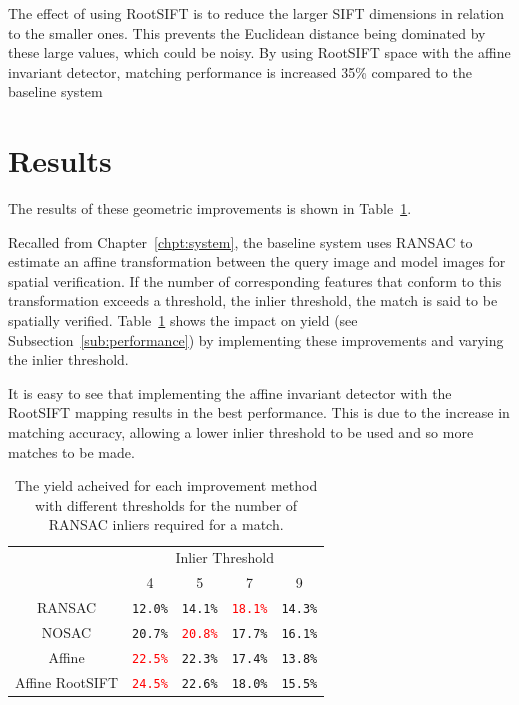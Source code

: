\documentclass[11pt, onecolumn, a4paper, final]{report} %
\begin{document}
The effect of using RootSIFT is to reduce the larger SIFT dimensions in relation to the smaller ones. This prevents the Euclidean distance being dominated by these large values, which could be noisy. By using RootSIFT space with the affine invariant detector, matching performance is increased 35\% compared to the baseline system



\section{Results}
The results of these geometric improvements is shown in Table~\ref{tbl:improvements}. 

Recalled from Chapter~\ref{chpt:system}, the baseline system uses RANSAC to estimate an affine transformation between the query image and model images for spatial verification. If the number of corresponding features that conform to this transformation exceeds a threshold, the inlier threshold, the match is said to be spatially verified. Table~\ref{tbl:improvements} shows the impact on yield (see Subsection~\ref{sub:performance}) by implementing these improvements and varying the inlier threshold.

It is easy to see that implementing the affine invariant detector with the RootSIFT mapping results in the best performance. This is due to the increase in matching accuracy, allowing a lower inlier threshold to be used and so more matches to be made.

\begin{table}[hbtp]
\begin{center}
\begin{tabular}{c|c|c|c|c|}
\cline{2-5}
 & \multicolumn{4}{|c|}{Inlier Threshold} \\ 
 \cline{2-5}
 & 4 & 5 & 7 & 9 \\
 \cline{2-5}
 \cline{1-5}
\multicolumn{1}{|c|}{RANSAC} & \texttt{12.0\%} & \texttt{14.1\%} & \textcolor{red}{\texttt{18.1\%}} & \texttt{14.3\%} \\  
\cline{1-5}
\multicolumn{1}{|c|}{NOSAC} & \texttt{20.7\%} & \textcolor{red}{\texttt{20.8\%}} & \texttt{17.7\%} & \texttt{16.1\%} \\  
\cline{1-5}
\multicolumn{1}{|c|}{Affine} & \textcolor{red}{\texttt{22.5\%}} & \texttt{22.3\%} &  \texttt{17.4\%} & \texttt{13.8\%} \\  
\cline{1-5}
\multicolumn{1}{|c|}{Affine RootSIFT} & \textcolor{red}{\texttt{24.5\%}} & \texttt{22.6\%} &  \texttt{18.0\%} & \texttt{15.5\%} \\  
\cline{1-5}
\end{tabular}
\end{center}
\caption{The yield acheived for each improvement method with different thresholds for the number of RANSAC inliers required for a match.}
\label{tbl:improvements}
\end{table}
\end{document}
